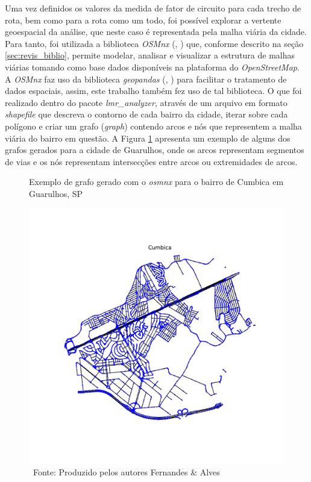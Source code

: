 Uma vez definidos os valores da medida de fator de circuito para cada trecho de rota, bem como para a rota como um todo, foi possível explorar a vertente geoespacial da análise, que neste caso é representada pela malha viária da cidade.
%
Para tanto, foi utilizada a biblioteca \textit{OSMnx} (, \citeyear{BOEING2017126}) que, conforme descrito na seção \ref{sec:revis_biblio}, permite modelar, analisar e visualizar a estrutura de malhas viárias tomando como base dados disponíveis na plataforma do \textit{OpenStreetMap}.
%
A \textit{OSMnx} faz uso da biblioteca \textit{geopandas} (, \citeyear{jordahl2014geopandas}) para facilitar o tratamento de dados espaciais, assim, este trabalho também fez uso de tal biblioteca. 
O que foi realizado dentro do pacote \textit{lmr\_analyzer}, através de um arquivo em formato \textit{shapefile} que descreva o contorno de cada bairro da cidade, iterar sobre cada polígono e criar um grafo (\textit{graph}) contendo arcos e nós que representem a malha viária do bairro em questão.
A Figura \ref{fig:graphs_gru_example} apresenta um exemplo de alguns dos grafos gerados para a cidade de Guarulhos, onde os arcos representam segmentos de vias e os nós representam intersecções entre arcos ou extremidades de arcos.

\begin{figure}[htb]
    \centering
    \caption{Exemplo de grafo gerado com o \textit{osmnx} para o bairro de Cumbica em Guarulhos, SP}
        \includegraphics[width=0.6\linewidth]{images/4_materiais/lmr_analyzer/graph_Cumbica.pdf}
    \caption*{\ Fonte: Produzido pelos autores Fernandes \& Alves}
    \label{fig:graphs_gru_example}
\end{figure}

